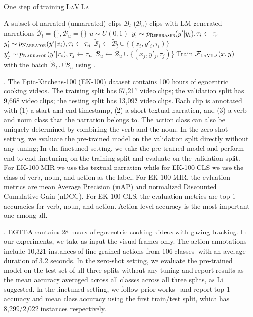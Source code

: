 \documentclass[10pt,twocolumn,letterpaper]{article}
\newcommand{\myparagraph}[1]{\vspace{0pt}\noindent{\bf #1}}
\newcommand{\ours}{\textsc{LaViLa}\xspace}
\newcommand{\narrator}{\textsc{Narrator}\xspace}
\newcommand{\rephraser}{\textsc{Rephraser}\xspace}
\newcommand{\ek}{EK-100\xspace}
\newcommand{\ekmir}{EK-100 MIR\xspace}
\newcommand{\ekcls}{EK-100 CLS\xspace}
\begin{document}
\begin{algorithm}[t]
	\caption{One step of training \ours}
	\label{alg:lavie}
	\begin{algorithmic}
		\Require A subset of narrated (unnarrated) clips $\mathcal{B}_l$ ($\mathcal{B}_u$)
		\State clips with LM-generated narrations $ \mathcal{\widetilde{B}}_l = \{\},  \mathcal{\widetilde{B}}_u = \{\} $
		\State $ u \sim U(0, 1) $ 
		 \Comment{Query \rephraser}
		\State $y'_i \sim p_\mathrm{\rephraser}(y'|y_i), \tau_i \gets \tau_{r}$
		\Else  \Comment{Query \narrator}
		\State $y'_i \sim p_\mathrm{\narrator}(y'|x_i), \tau_i \gets \tau_{n}$
		\EndIf
		\State $ \mathcal{\widetilde{B}}_l \gets \mathcal{\widetilde{B}}_l \cup \{ (x_i, y'_i, \tau_i) \}$
		\EndFor
		\State $y'_j \sim p_\mathrm{\narrator}(y'|x_i), \tau_j \gets \tau_{n}$
		\State $ \mathcal{\widetilde{B}}_u \gets \mathcal{\widetilde{B}}_u \cup \{ (x_j, y'_j, \tau_j) \}$
		\EndFor
		\State Train $\mathcal{F}_\mathrm{\ours}(x, y)$ with the batch $  \mathcal{\widetilde{B}}_l \cup  \mathcal{\widetilde{B}}_u $ using .
	\end{algorithmic}
\end{algorithm}

\myparagraph{\ek}.
The Epic-Kitchens-100 (\ek) dataset contains 100 hours of egocentric cooking videos.
The training split has 67,217 video clips; the validation split has 9,668 video clips; the testing split has 13,092 video clips.
Each clip is annotated with (1) a start and end timestamp, (2) a short textual narration, and (3) a verb and noun class that the narration belongs to.
The action class can also be uniquely determined by combining the verb and the noun.
In the zero-shot setting, we evaluate the pre-trained model on the validation split directly without any tuning;
In the finetuned setting, we take the pre-trained model and perform end-to-end finetuning on the training split and evaluate on the validation split.
For \ekmir we use the textual narration while for \ekcls we use the class of verb, noun, and action as the label.
For \ekmir, the evluation metrics are mean Average Precision (mAP) and normalized Discounted Cumulative Gain (nDCG).
For \ekcls, the evaluation metrics are top-1 accuracies for verb, noun, and action.
Action-level accuracy is the most important one among all.

\myparagraph{EGTEA}.
EGTEA contains 28 hours of egocentric cooking videos with gazing tracking.
In our experiments, we take as input the visual frames only.
The action annotations include 10,321 instances of fine-grained actions from 106 classes, with an average duration of 3.2 seconds.
In the zero-shot setting, we evaluate the pre-trained model on the test set of all three splits without any tuning and report results as the mean accuracy averaged across all classes across all three splits, as Li~\etal~\cite{li2018egtea} suggested.
In the finetuned setting, we follow prior works~\cite{kazakos2021little} and report top-1 accuracy and mean class accuracy using the first train/test split, which has 8,299/2,022 instances respectively.
\end{document}
